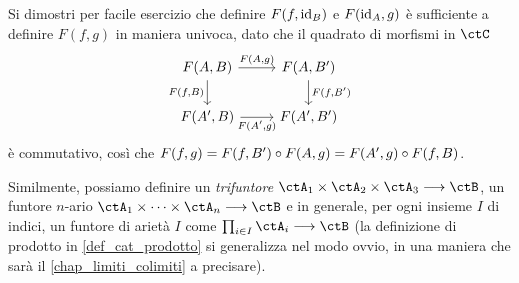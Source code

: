 Si dimostri per facile esercizio che definire \(F(f,\mathrm{id}_B)\) e \(F(\mathrm{id}_A,g)\) è sufficiente a definire \(F(f,g)\) in maniera univoca, dato che il quadrato di morfismi in \(\ctC\)
\[
	\begin{tikzcd}
		F(A,B) \ar[r, "{F(A,g)}"]\ar[d, "{F(f,B)}"'] & F(A,B') \ar[d, "{F(f,B')}"]\\
		F(A',B) \ar[r, "{F(A',g)}"'] & F(A',B')
	\end{tikzcd}
\]
è commutativo, così che \(F(f,g)=F(f,B')\circ F(A,g) = F(A',g)\circ F(f,B)\).
\begin{notation}
	Similmente, possiamo definire un \emph{trifuntore} \(\ctA_1\times\ctA_2\times\ctA_3\fun\ctB\), un funtore \(n\)-ario \(\ctA_1\times\dots\times\ctA_n\fun\ctB\) e in generale, per ogni insieme \(I\) di indici, un funtore di arietà \(I\) come \(\prod_{i\in I}\ctA_i\fun\ctB\) (la definizione di prodotto in \ref{def_cat_prodotto} si generalizza nel modo ovvio, in una maniera che sarà il \autoref{chap_limiti_colimiti} a precisare).
\end{notation}
